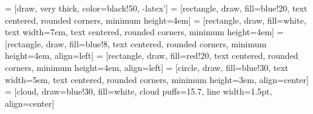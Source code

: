 \documentclass[10pt]{article}
\begin{document}
\vspace*{10px}


 = [draw, very thick, color=black!50, -latex']
 = [rectangle, draw, fill=blue!20, text centered, rounded corners,
                    minimum height=4em]
 = [rectangle, draw, fill=white, text width=7em, text centered, rounded corners,
                    minimum height=4em]
   = [rectangle, draw, fill=blue!8, text centered, rounded corners,
                        minimum height=4em, align=left]
 = [rectangle, draw, fill=red!20, text centered, rounded corners,
                        minimum height=4em, align=left]
  = [circle, draw, fill=blue!30, text width=5em, text centered, rounded corners,
                        minimum height=3em, align=center]
 = [cloud, draw=blue!30, fill=white, cloud puffs=15.7, line width=1.5pt,
                        align=center]
\end{document}
